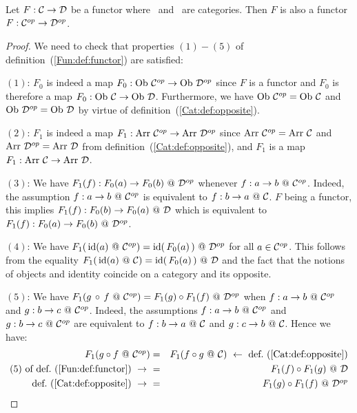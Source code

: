 \begin{prop}\label{Fun:prop:opposite}
    Let $F:\mbox{$\cal C$}\to\mbox{$\cal D$}$ be a functor where \Cat\ and \Dat\ are categories. Then
    $F$ is also a functor $F:\mbox{${\cal C}^{op}$}\to\mbox{${\cal D}^{op}$}$.
\end{prop}
\begin{proof}
    We need to check that properties $(1)-(5)$ of 
    definition~(\ref{Fun:def:functor}) are satisfied:

    $(1)$: $F_{0}$ is indeed a map $F_{0}:\ob\ \Cop\to\ob\ \Dop$ since $F$ is
    a functor and $F_{0}$ is therefore a map $F_{0}:\ob\ \Cat\to\ob\ \Dat$. 
    Furthermore, we have $\ob\ \Cop=\ob\ \Cat$ and $\ob\ \Dop=\ob\ \Dat$ by 
    virtue of definition~(\ref{Cat:def:opposite}).

    $(2)$: $F_{1}$ is indeed a map $F_{1}:\arr\ \Cop\to\arr\ \Dop$ since
    $\arr\ \Cop=\arr\ \Cat$ and $\arr\ \Dop=\arr\ \Dat$ from
    definition~(\ref{Cat:def:opposite}), and $F_{1}$ is a map
    $F_{1}:\arr\ \Cat\to\arr\ \Dat$.

    $(3)$: We have $F_{1}(f):F_{0}(a)\to F_{0}(b)\ @\ \Dop$ whenever
    $f:a\to b\ @\ \Cop$. Indeed, the assumption $f:a\to b\ @\ \Cop$ is equivalent
    to $f:b\to a\ @\ \Cat$. $F$ being a functor, this implies
    $F_{1}(f):F_{0}(b)\to F_{0}(a)\ @\ \mbox{$\cal D$}$ which is equivalent to 
    $F_{1}(f):F_{0}(a)\to F_{0}(b)\ @\ \Dop$.

    $(4)$: We have $F_{1}(\,\id(a)\ @\ \Cop)=\id(\,F_{0}(a)\,)\ @\ \Dop$ for
    all $a\in\mbox{${\cal C}^{op}$}$. This follows from the equality $F_{1}(\,\mbox{\rm id}(a)\ @\ \mbox{$\cal C$})
    =\mbox{\rm id}(\,F_{0}(a)\,)\ @\ \mbox{$\cal D$}$ and the fact that the notions of objects and
    identity coincide on a category and its opposite.

    $(5)$: We have $F_{1}(g\,\circ\,f\ @\ \Cop)=F_{1}(g)\circ F_{1}(f)\ @\ \Dop$
    when $f:a\to b\ @\ \Cop$ and $g:b\to c\ @\ \mbox{${\cal C}^{op}$}$. Indeed, the assumptions
    $f:a\to b\ @\ \Cop$ and $g:b\to c\ @\ \mbox{${\cal C}^{op}$}$ are equivalent to 
    $f:b\to a\ @\ \Cat$ and $g:c\to b\ @\ \mbox{$\cal C$}$. Hence we have:
        \begin{eqnarray*}F_{1}(g\circ f\ @\ \Cop)
            &=&F_{1}(f\circ g\ @\ \Cat)\ \leftarrow\ 
            \mbox{def.~(\ref{Cat:def:opposite})}\\
            \mbox{$(5)$ of def.~(\ref{Fun:def:functor})}\ \to\ 
            &=&F_{1}(f)\circ F_{1}(g)\ @\ \Dat\\
            \mbox{def.~(\ref{Cat:def:opposite})}\ \to\ 
            &=&F_{1}(g)\circ F_{1}(f)\ @\ \Dop
        \end{eqnarray*}
\end{proof}
